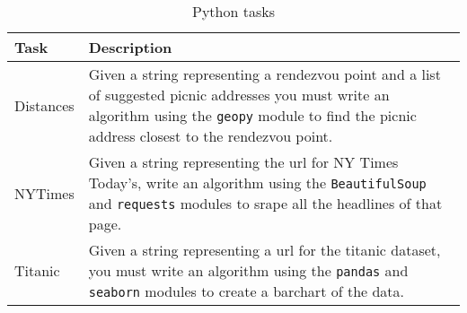 \begin{table}
\centering
\caption{Python tasks}
\begin{scriptsize}
\begin{tabular}{ll}
\hline
\textbf{Task} & \textbf{Description}                                                                                         \\
\hline
\hline
Distances     &
\parbox[l][1.2cm][c]{11cm}{Given a string representing a rendezvou point and a list of suggested picnic addresses
    you must write an algorithm using the \texttt{geopy} module to find the  picnic address closest to the rendezvou point.} \\
%
NYTimes       &
\parbox[l][1cm][c]{11cm}{Given a string representing the url for NY Times Today's,
    write an algorithm using the \texttt{BeautifulSoup} and \texttt{requests} modules to srape all the headlines of that page.}
\\
%
Titanic       &
\parbox[l][1cm][c]{11cm}{Given a string representing a url for the titanic dataset,
    you must write an algorithm using the \texttt{pandas} and \texttt{seaborn} modules to create a barchart of the data.}    \\
\hline
\end{tabular}
\end{scriptsize}
\smallskip
\label{tbl:python-tasks-modules}
\end{table}

